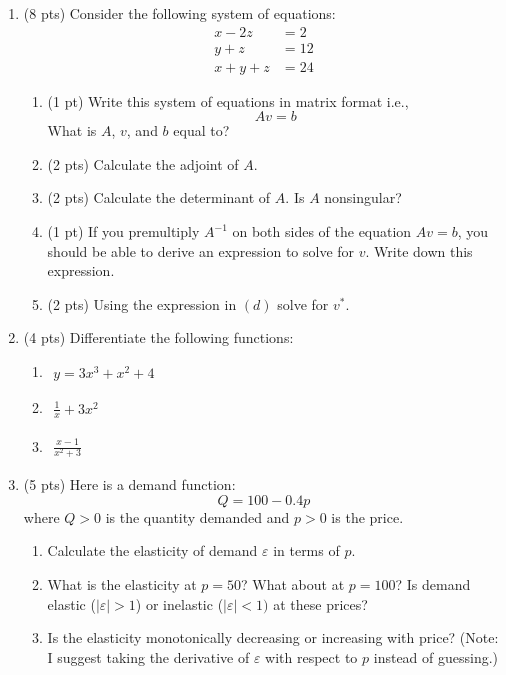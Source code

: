 \documentclass{./../../../Latex/tests}
\begin{document}
\begin{enumerate}
\item (8 pts) Consider the following system of equations:
\begin{align*}
x-2z & = 2 \\
y+z & = 12 \\
x+y+z &= 24	
\end{align*}
\begin{enumerate}
  \item (1 pt) Write this system of equations in matrix format i.e., $$ Av=b $$
  What is $A$, $v$, and $b$ equal to?
  \newpage
   \item (2 pts) Calculate the adjoint of $A$. \vspace{8.5cm}
  \item (2 pts) Calculate the determinant of $A$. Is $A$ nonsingular? \vspace{4.5cm}
  \item (1 pt) If you premultiply $A^{-1}$ on both sides of the equation $ Av=b $, you should be able to derive an expression to solve for $v$. Write down this expression. \vspace{2cm}
  \item (2 pts) Using the expression in $(d)$ solve for $v^*$. 
\end{enumerate}

\newpage
\item (4 pts) Differentiate the following functions:
\begin{enumerate}
\item $ \begin{aligned} y = 3x^3+x^2+4 \end{aligned} $ \vspace{2cm}
  \item $ \begin{aligned} \frac{1}{x}+3x^2 \end{aligned} $ \vspace{2cm}
  \item $\begin{aligned} \frac{x-1}{x^2+3} \end{aligned}$ \vspace{2cm}
\end{enumerate}


\vspace{1cm}

\item (5 pts) Here is a demand function:
 $$ Q = 100-0.4p$$
 where $Q>0$ is the quantity demanded and $p>0$ is the price. 
 \begin{enumerate}
  \item  Calculate the elasticity of demand $\varepsilon$ in terms of $p$. \vspace{3.5cm}
  \item What is the elasticity at $p=50$? What about at $p=100$? Is demand elastic ($|\varepsilon|>1$) or inelastic ($|\varepsilon|<1)$ at these prices? \newpage
  \item Is the elasticity monotonically decreasing or increasing with price? (Note: I suggest taking the derivative of $\varepsilon$ with respect to $p$ instead of guessing.)\vspace{4.5cm}
\end{enumerate}


\end{enumerate}
\end{document}
